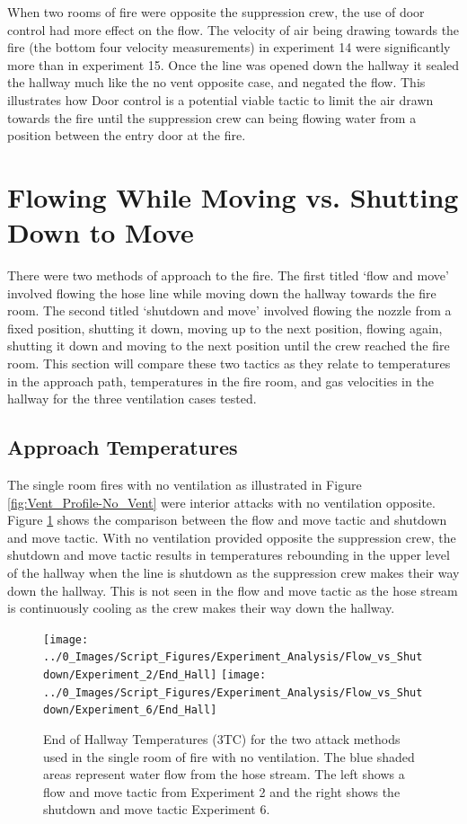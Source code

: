 \documentclass[12pt,oneside]{book}
\begin{document}
When two rooms of fire were opposite the suppression crew, the use of door control had more effect on the flow. The velocity of air being drawing towards the fire (the bottom four velocity measurements) in experiment 14 were significantly more than in experiment 15. Once the line was opened down the hallway it sealed the hallway much like the no vent opposite case, and negated the flow. This illustrates how Door control is a potential viable tactic to limit the air drawn towards the fire until the suppression crew can being flowing water from a position between the entry door at the fire.   

\section{Flowing While Moving vs. Shutting Down to Move}
There were two methods of approach to the fire. The first titled `flow and move' involved flowing the hose line while moving down the hallway towards the fire room. The second titled `shutdown and move' involved flowing the nozzle from a fixed position, shutting it down, moving up to the next position, flowing again, shutting it down and moving to the next position until the crew reached the fire room. This section will compare these two tactics as they relate to temperatures in the approach path, temperatures in the fire room, and gas velocities in the hallway for the three ventilation cases tested. 

\subsection{Approach Temperatures}

The single room fires with no ventilation as illustrated in Figure \ref{fig:Vent_Profile-No_Vent} were interior attacks with no ventilation opposite. Figure \ref{fig:Flow_vs_Shut_Single_No_Vent} shows the comparison between the flow and move tactic and shutdown and move tactic. With no ventilation provided opposite the suppression crew, the shutdown and move tactic results in temperatures rebounding in the upper level of the hallway when the line is shutdown as the suppression crew makes their way down the hallway. This is not seen in the flow and move tactic as the hose stream is continuously cooling as the crew makes their way down the hallway. 

\begin{figure}[H]
\centering
\texttt{[image: ../0\_Images/Script\_Figures/Experiment\_Analysis/Flow\_vs\_Shutdown/Experiment\_2/End\_Hall]}
\texttt{[image: ../0\_Images/Script\_Figures/Experiment\_Analysis/Flow\_vs\_Shutdown/Experiment\_6/End\_Hall]}
\caption[Hall Temp. - No Vent - Flow \& Move vs. Shutdown \& Move]{End of Hallway Temperatures (3TC) for the two attack methods used in the single room of fire with no ventilation. The blue shaded areas represent water flow from the hose stream. The left shows a flow and move tactic from Experiment 2 and the right shows the shutdown and move tactic Experiment 6.}
\label{fig:Flow_vs_Shut_Single_No_Vent}
\end{figure}
\end{document}

